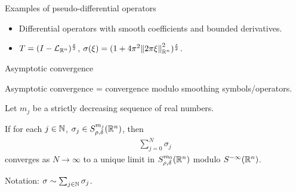 \documentclass{beamer}
\begin{document}
\begin{frame}
    {Examples of pseudo-differential operators}

    \begin{itemize}
        \item Differential operators with smooth coefficients and bounded derivatives.
        \item $T = \BesselPotential s$, $\sigma(\xi) = (1 + 4 \pi^2 \norm [\R^n] {\turn \xi}^2)^{\frac s 2}$.
    \end{itemize}
\end{frame}

\begin{frame}
    {Asymptotic convergence}

    Asymptotic convergence = convergence modulo smoothing symbols/operators.
    \pause
    \begin{theorem}
        Let $m_j$ be a strictly decreasing sequence of real numbers.

        If for each $j \in \N$, $\sigma_j \in \SymbolClass {m_j} {\rho, \delta}$,
        then
        \begin{align*}
            \sum_{j = 0}^{N} \sigma_j
        \end{align*}
        converges as $N \to \infty$ to a unique limit in $\SymbolClass {m_0} {\rho, \delta}$ modulo $\SmoothingSymbols$.
    \end{theorem}

    \pause
    Notation: $\sigma \sim \sum_{j \in \N} \sigma_j$.
\end{frame}
\end{document}
